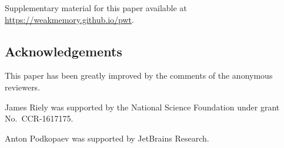 




Supplementary material for this paper available at
\url{https://weakmemory.github.io/pwt}.

\subsection*{Acknowledgements}
This paper has been greatly improved by the comments of the anonymous reviewers.

James Riely was supported by the National Science Foundation under
grant No.~CCR-1617175.


Anton Podkopaev was supported by JetBrains Research.


